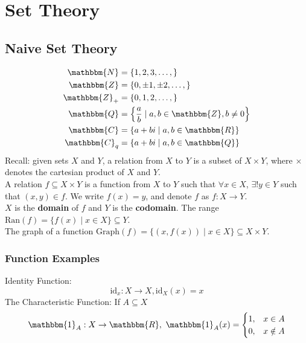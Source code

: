 \documentclass[10pt]{extarticle}
\title{}
\author{Avinash Iyer}
\date{}
\begin{document}
\tableofcontents
\section{Set Theory}%
\subsection{Naive Set Theory}%
    \begin{align*}
      \mathbbm{N} &= \{1,2,3,\dots,\}\\
      \mathbbm{Z} &= \{0,\pm1,\pm2,\dots,\} \\
      \mathbbm{Z}_+ &= \{0,1,2,\dots,\}\\
      \mathbbm{Q} &= \left\{\frac{a}{b} \mid a,b\in\mathbbm{Z},b\neq 0\right\}\\
      \mathbbm{C} &= \{a+bi \mid a,b\in \mathbbm{R}\}\\
      \mathbbm{C}_q &= \{a+bi \mid a,b\in \mathbbm{Q}\}
    \end{align*}
    Recall: given sets $X$ and $Y$, a relation from $X$ to $Y$ is a subset of $X\times Y$, where $\times$ denotes the cartesian product of $X$ and $Y$.\\

    A relation $f\subseteq X\times Y$ is a function from $X$ to $Y$ such that $\forall x\in X$, $\exists!y\in Y$ such that $(x,y) \in f$. We write $f(x) = y$, and denote $f$ as $f:X\rightarrow Y$.\\

    $X$ is the \textbf{domain} of $f$ and $Y$ is the \textbf{codomain}. The range $\text{Ran}(f) = \{f(x)\mid x\in X\}\subseteq Y$. \\

    The graph of a function $\text{Graph}(f) = \{(x,f(x))\mid x\in X\} \subseteq X\times Y$.
    \subsubsection{Function Examples}%
    Identity Function:
      \[\text{id}_x: X\rightarrow X, \text{id}_X(x) = x\]
      The Characteristic Function: If $A\subseteq X$
      \[\mathbbm{1}_A: X\rightarrow \mathbbm{R}, ~\mathbbm{1}_A(x) = \begin{cases}
        1,&x\in A\\
        0,&x\notin A
      \end{cases}\]
\end{document}

